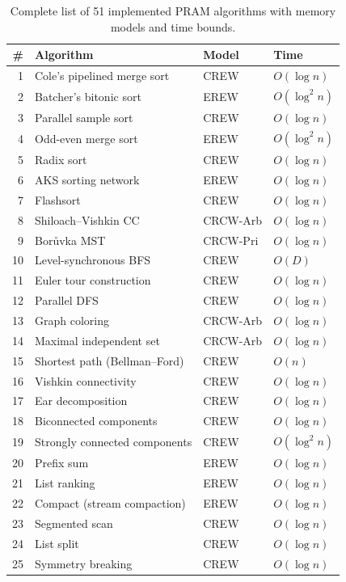 \documentclass[11pt]{article}
\begin{document}
\begin{table}[p]
\centering
\caption{Complete list of 51 implemented PRAM algorithms with memory models
  and time bounds.}
\label{tab:fullcatalog}
\scriptsize
\begin{tabular}{@{}rlll@{}}
\toprule
\textbf{\#} & \textbf{Algorithm} & \textbf{Model} & \textbf{Time} \\
\midrule
1 & Cole's pipelined merge sort & CREW & $O(\log n)$ \\
2 & Batcher's bitonic sort & EREW & $O(\log^2 n)$ \\
3 & Parallel sample sort & CREW & $O(\log n)$ \\
4 & Odd-even merge sort & EREW & $O(\log^2 n)$ \\
5 & Radix sort & CREW & $O(\log n)$ \\
6 & AKS sorting network & EREW & $O(\log n)$ \\
7 & Flashsort & CREW & $O(\log n)$ \\
\midrule
8 & Shiloach--Vishkin CC & CRCW-Arb & $O(\log n)$ \\
9 & Bor\r{u}vka MST & CRCW-Pri & $O(\log n)$ \\
10 & Level-synchronous BFS & CREW & $O(D)$ \\
11 & Euler tour construction & CREW & $O(\log n)$ \\
12 & Parallel DFS & CREW & $O(\log n)$ \\
13 & Graph coloring & CRCW-Arb & $O(\log n)$ \\
14 & Maximal independent set & CRCW-Arb & $O(\log n)$ \\
15 & Shortest path (Bellman--Ford) & CREW & $O(n)$ \\
\midrule
16 & Vishkin connectivity & CREW & $O(\log n)$ \\
17 & Ear decomposition & CREW & $O(\log n)$ \\
18 & Biconnected components & CREW & $O(\log n)$ \\
19 & Strongly connected components & CREW & $O(\log^2 n)$ \\
\midrule
20 & Prefix sum & EREW & $O(\log n)$ \\
21 & List ranking & EREW & $O(\log n)$ \\
22 & Compact (stream compaction) & EREW & $O(\log n)$ \\
23 & Segmented scan & CREW & $O(\log n)$ \\
24 & List split & CREW & $O(\log n)$ \\
25 & Symmetry breaking & CREW & $O(\log n)$ \\

\end{tabular}
\end{table}
\end{document}

